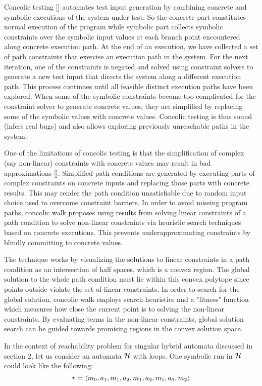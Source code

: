 Concolic testing [] automates test input generation by combining concrete and symbolic executions of the system under test. So the concrete part constitutes normal execution of the program while symbolic part collects symbolic constraints over the symbolic input values at each branch point encountered along concrete execution path. At the end of an execution, we have collected a set of path constraints that exercise an execution path in the system. For the next iteration, one of the constraints is negated and solved using constraint solvers to generate a new test input that directs the system along a different execution path. This process continues until all feasible distinct execution paths have been explored. When some of the symbolic constraints become too complicated for the constraint solver to generate concrete values, they are simplified by replacing some of the symbolic values with concrete values.
Concolic testing is thus sound (infers real bugs) and also allows exploring previously unreachable paths in the system. 

One of the limitations of concolic testing is that the simplification of complex (say non-linear) constraints with concrete values may result in bad approximations []. Simplified path conditions are generated by executing parts of complex constraints on concrete inputs and replacing those parts with concrete results. This may render the path condition unsatisfiable due to random input choice used to overcome constraint barriers. In order to avoid missing program paths, concolic walk proposes using results from solving linear constraints of a path condition to solve non-linear constraints via heuristic search techniques based on concrete executions. This prevents underapproximating constraints by blindly committing to concrete values. 

The technique works by visualizing the solutions to linear constraints in a path condition as an intersection of half spaces, which is a convex region. The global solution to the whole path condition must lie within this convex polytope since points outside violate the set of linear constraints. In order to search for the global solution, concolic walk employs search heuristics and a "fitness" function which measures how close the current point is to solving the non-linear constraints. By evaluating terms in the non-linear constraints, global solution search can be guided towards promising regions in the convex solution space.
 
In the context of reachability problem for singular hybrid automata discussed in section 2, let us consider an automata $\mathcal{H}$ with loops. One symbolic run in $\mathcal{H}$ could look like the following: 
\[
  r = \langle m_0, a_1, m_1, a_2, m_1, a_2, m_1, a_3, m_2 \rangle
\] 

